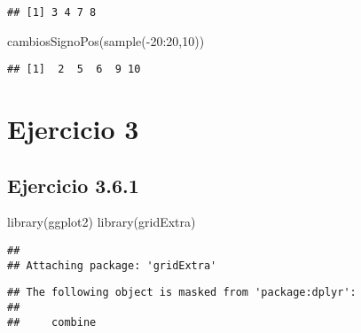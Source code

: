 \documentclass[
]{article}
\newenvironment{Shaded}{\begin{snugshade}}{\end{snugshade}}
\newcommand{\DecValTok}[1]{\textcolor[rgb]{0.00,0.00,0.81}{#1}}
\newcommand{\FunctionTok}[1]{\textcolor[rgb]{0.00,0.00,0.00}{#1}}
\newcommand{\NormalTok}[1]{#1}
\newcommand{\SpecialCharTok}[1]{\textcolor[rgb]{0.00,0.00,0.00}{#1}}
\begin{document}
\begin{verbatim}
## [1] 3 4 7 8
\end{verbatim}

\begin{Shaded}
\begin{Highlighting}[]
\FunctionTok{cambiosSignoPos}\NormalTok{(}\FunctionTok{sample}\NormalTok{(}\SpecialCharTok{{-}}\DecValTok{20}\SpecialCharTok{:}\DecValTok{20}\NormalTok{,}\DecValTok{10}\NormalTok{))}
\end{Highlighting}
\end{Shaded}

\begin{verbatim}
## [1]  2  5  6  9 10
\end{verbatim}

\hypertarget{ejercicio-3}{%
\section{Ejercicio 3}\label{ejercicio-3}}

\hypertarget{ejercicio-3.6.1}{%
\subsection{Ejercicio 3.6.1}\label{ejercicio-3.6.1}}

\begin{Shaded}
\begin{Highlighting}[]
\FunctionTok{library}\NormalTok{(ggplot2)}
\FunctionTok{library}\NormalTok{(gridExtra)}
\end{Highlighting}
\end{Shaded}

\begin{verbatim}
## 
## Attaching package: 'gridExtra'
\end{verbatim}

\begin{verbatim}
## The following object is masked from 'package:dplyr':
## 
##     combine
\end{verbatim}
\end{document}
